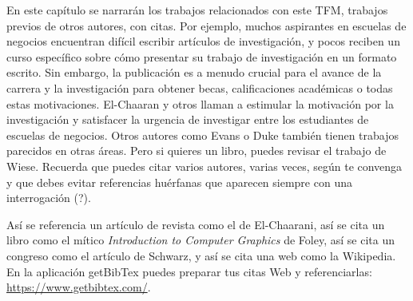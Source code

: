 En este capítulo se narrarán los trabajos relacionados con este TFM, trabajos previos de otros autores, con citas. Por ejemplo, muchos aspirantes en escuelas de negocios encuentran difícil escribir artículos de investigación, y pocos reciben un curso específico sobre cómo presentar su trabajo de investigación en un formato escrito. Sin embargo, la publicación es a menudo crucial para el avance de la carrera y la investigación para obtener becas, calificaciones académicas o todas estas motivaciones. El-Chaaran y otros\cite{el2021write} llaman a estimular la motivación por la investigación y satisfacer la urgencia de investigar entre los estudiantes de escuelas de negocios. Otros autores como Evans\cite{evans2011write} o Duke\cite{duke2018postgraduate} también tienen trabajos parecidos en otras áreas. Pero si quieres un libro, puedes revisar el trabajo de Wiese\cite{wiese2023write}. Recuerda que puedes citar varios autores, varias veces, según te convenga\cite{el2021write, evans2011write,duke2018postgraduate} y que debes evitar referencias huérfanas\cite{autordesconocido} que aparecen siempre con una interrogación (?).

Así se referencia un artículo de revista como el de El-Chaarani\cite{el2021write}, así se cita un libro como el mítico \emph{Introduction to Computer Graphics} de Foley\cite{foley1994introduction}, así se cita un congreso como el artículo de Schwarz\cite{schwarz2007modeling}, y así se cita una web como la Wikipedia\cite{wikipediaComputerGraphics}. En la aplicación getBibTex\cite{getbibtexBibTeXGenerator} puedes preparar tus citas Web y referenciarlas: \url{https://www.getbibtex.com/}.

